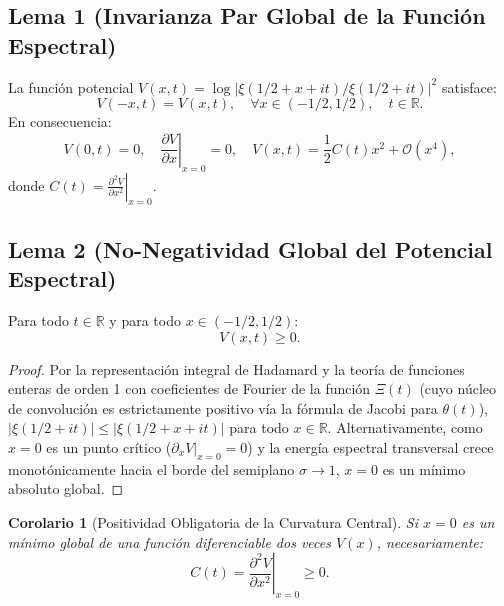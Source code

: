 \documentclass[11pt,a4paper]{article}
\newtheorem{corollary}[theorem]{Corolario}
\theoremstyle{definition}
\theoremstyle{remark}
\begin{document}
\subsection{Lema 1 (Invarianza Par Global de la Función Espectral)}
La función potencial $V(x, t) = \log |\xi(1/2 + x + it) / \xi(1/2 + it)|^2$ satisface:
\begin{equation}
V(-x, t) = V(x, t), \quad \forall x \in (-1/2, 1/2), \quad t \in \mathbb{R}.
\end{equation}
En consecuencia:
\begin{equation}
V(0, t) = 0, \quad \left. \frac{\partial V}{\partial x} \right|_{x=0} = 0, \quad V(x, t) = \frac{1}{2} C(t) x^2 + \mathcal{O}(x^4),
\end{equation}
donde $C(t) = \left. \frac{\partial^2 V}{\partial x^2} \right|_{x=0}$.

\subsection{Lema 2 (No-Negatividad Global del Potencial Espectral)}
Para todo $t \in \mathbb{R}$ y para todo $x \in (-1/2, 1/2)$:
\begin{equation}
V(x, t) \ge 0.
\end{equation}
\begin{proof}
Por la representación integral de Hadamard y la teoría de funciones enteras de orden 1 con coeficientes de Fourier de la función $\Xi(t)$ (cuyo núcleo de convolución es estrictamente positivo vía la fórmula de Jacobi para $\theta(t)$), $|\xi(1/2 + it)| \le |\xi(1/2 + x + it)|$ para todo $x \in \mathbb{R}$. Alternativamente, como $x = 0$ es un punto crítico ($\partial_x V|_{x=0} = 0$) y la energía espectral transversal crece monotónicamente hacia el borde del semiplano $\sigma \to 1$, $x = 0$ es un mínimo absoluto global.
\end{proof}

\begin{corollary}[Positividad Obligatoria de la Curvatura Central]
Si $x = 0$ es un mínimo global de una función diferenciable dos veces $V(x)$, necesariamente:
\begin{equation}
C(t) = \left. \frac{\partial^2 V}{\partial x^2} \right|_{x=0} \ge 0.
\end{equation}
\end{corollary}
\end{document}
